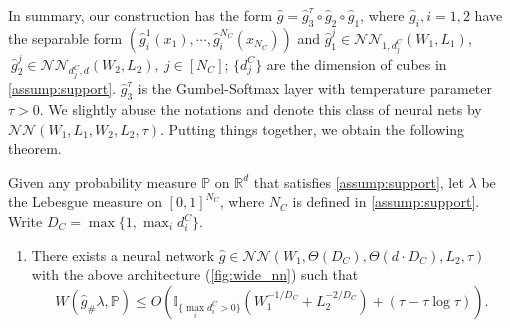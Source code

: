 In summary, our construction has the form $ \hat{g} =\hat{g}_{3}^{\tau } \circ \hat{g}_{2} \circ \hat{g}_{1} $, where $ \hat{g}_{i} ,i=1,2$ have the separable form $ \left(\hat{g}_{i}^{1}( x_{1}) ,\cdots ,\hat{g}_{i}^{N_{C}}( x_{N_{C}})\right)$ and $ \hat{g}_{1}^{j} \in \mathcal{NN}_{1,d_j^C}( W_{1} , L_1)$, $ \ \hat{g}_{2}^{j} \in \mathcal{NN}_{d_j^C,d}(W_2 ,L_{2}) ,\ j\in [ N_{C}]$; $ \{d_j^C\} $ are the dimension of cubes in \cref{assump:support}. $ \hat{g}_{3}^{\tau }$ is the Gumbel-Softmax layer with temperature parameter $ \tau>0 $. We slightly abuse the notations and denote this class of neural nets by  $\mathcal{NN}(W_1,L_1,W_2,L_2,\tau) $. Putting things together, we obtain the following theorem.
\begin{theorem}\label{thm:wide_nn}
Given any probability measure $\mathbb P$ on $\mathbb R^d$ that satisfies \cref{assump:support}, let $\lambda$ be the Lebesgue measure on $[0,1]^{N_C}$, where $N_C$ is defined in \cref{assump:support}. Write $D_C=\max\{1,\max_i d_i^C\}$. 
  \begin{enumerate}
\item There exists a neural network $\hat g\in\mathcal{NN}(W_1,\Theta(D_C),\Theta(d\cdot D_C),L_2,\tau)$ with the above architecture (\cref{fig:wide_nn}) such that
\begin{equation*}
W(\hat g_{\#}\lambda,\mathbb P)\leqslant O\left(\mathbb I_{\{\max_i d_i^C>0\}}\left(W_1^{-1/D_C}+L_2^{-2/D_C}\right)+(\tau-\tau\log\tau)\right).
\end{equation*}
\end{enumerate}
\end{theorem}

